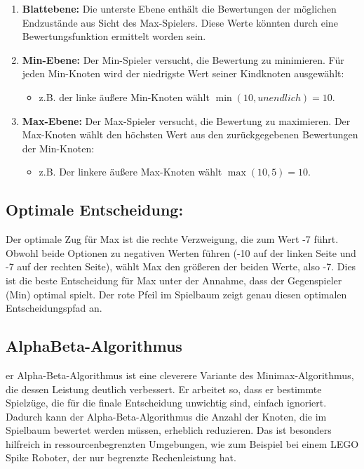 \begin{enumerate}
	\item \textbf{Blattebene:} Die unterste Ebene enthält die Bewertungen der möglichen Endzustände aus Sicht des Max-Spielers. Diese Werte könnten durch eine Bewertungsfunktion ermittelt worden sein.

	\item \textbf{Min-Ebene:} Der Min-Spieler versucht, die Bewertung zu minimieren. Für jeden Min-Knoten wird der niedrigste Wert seiner Kindknoten ausgewählt:
	\begin{itemize}
		\item z.B. der linke äußere Min-Knoten wählt $\min(10, unendlich) = 10$.
	\end{itemize}
	
	\item \textbf{Max-Ebene:} Der Max-Spieler versucht, die Bewertung zu maximieren. Der Max-Knoten wählt den höchsten Wert aus den zurückgegebenen Bewertungen der Min-Knoten:
	\begin{itemize}
		\item z.B. Der linkere äußere Max-Knoten wählt $\max(10, 5) = 10$.
	\end{itemize}
\end{enumerate}

\subsection*{Optimale Entscheidung:}

Der optimale Zug für Max ist die rechte Verzweigung, die zum Wert -7 führt. Obwohl beide Optionen zu negativen Werten führen (-10 auf der linken Seite und -7 auf der rechten Seite), wählt Max den größeren der beiden Werte, also -7. Dies ist die beste Entscheidung für Max unter der Annahme, dass der Gegenspieler (Min) optimal spielt. Der rote Pfeil im Spielbaum zeigt genau diesen optimalen Entscheidungspfad an.

\subsection{AlphaBeta-Algorithmus}

er Alpha-Beta-Algorithmus ist eine cleverere Variante des Minimax-Algorithmus, die dessen Leistung deutlich verbessert. Er arbeitet so, dass er bestimmte Spielzüge, die für die finale Entscheidung unwichtig sind, einfach ignoriert. Dadurch kann der Alpha-Beta-Algorithmus die Anzahl der Knoten, die im Spielbaum bewertet werden müssen, erheblich reduzieren. Das ist besonders hilfreich in ressourcenbegrenzten Umgebungen, wie zum Beispiel bei einem LEGO Spike Roboter, der nur begrenzte Rechenleistung hat.

